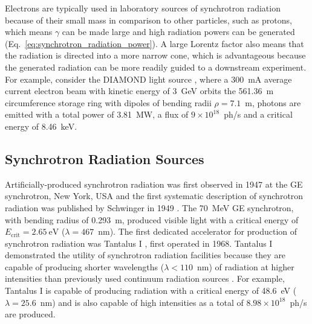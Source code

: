 \documentclass[../main.tex]{subfiles}
\begin{document}
Electrons are typically used in laboratory sources of synchrotron radiation because of their small mass in comparison to other particles, such as protons, which means $\gamma$ can be made large and high radiation powers can be generated (Eq.~\ref{eq:synchrotron_radiation_power}). A large Lorentz factor also means that the radiation is directed into a more narrow cone, which is advantageous because the generated radiation can be more readily guided to a downstream experiment. For example, consider the DIAMOND light source \cite{materlik2015diamond}, where a 300~\si{\milli\ampere} average current electron beam with kinetic energy of 3~\si{\giga\electronvolt} orbits the 561.36~\si{\meter} circumference storage ring with dipoles of bending radii $\rho = 7.1$~\si{\meter}, photons are emitted with a total power of 3.81~\si{\mega\watt}, a flux of $9\times 10^{18}$~ph/\si{\second} and a critical energy of 8.46~\si{\kilo\electronvolt}.   

\subsection{Synchrotron Radiation Sources}

Artificially-produced synchrotron radiation was first observed in 1947 at the GE synchrotron, New York, USA \cite{elder1948radiation} and the first systematic description of synchrotron radiation was published by Schwinger in 1949 \cite{schwinger1949classical}. The 70~\si{\mega\electronvolt} GE synchrotron, with bending radius of 0.293~\si{\meter}, produced visible light with a critical energy of $E_{\mathrm{crit}} = 2.65~\si{\electronvolt}$ ($\lambda = 467$~\si{\nano\meter}). The first dedicated accelerator for production of synchrotron radiation was Tantalus I \cite{rowe1973tantalus}, first operated in 1968. Tantalus I demonstrated the utility of synchrotron radiation facilities because they are capable of producing shorter wavelengths ($\lambda < 110$~\si{\nano\meter}) of radiation at higher intensities than previously used continuum radiation sources \cite{rowe1973tantalus}. For example, Tantalus I is capable of producing radiation with a critical energy of 48.6~\si{\electronvolt} ($\lambda = 25.6$~\si{\nano\meter}) and is also capable of high intensities as a total of $8.98\times 10^{18}$~ph/\si{\second} are produced.  
\end{document}
